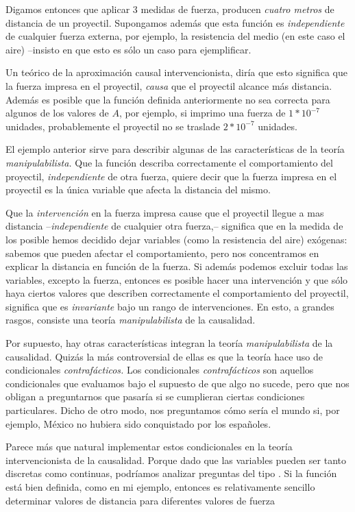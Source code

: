 Digamos entonces que aplicar 3 medidas de fuerza, producen
\emph{cuatro metros} de distancia de un proyectil. Supongamos además
que esta función es \emph{independiente} de cualquier fuerza externa,
por ejemplo, la resistencia del medio (en este caso el aire)
--insisto en que esto es sólo un caso para ejemplificar.

Un teórico de la aproximación causal intervencionista, diría que
esto significa que la fuerza impresa en el proyectil, \emph{causa}
que el proyectil alcance más distancia. Además es posible que la
función definida anteriormente no sea correcta para algunos de los
valores de $A$, por ejemplo, si imprimo una fuerza de $1*10^{-7}$
unidades, probablemente el proyectil no se traslade $2*10^{-7}$
unidades.

El ejemplo anterior sirve para describir algunas de las características de la teoría \emph{manipulabilista.}
Que la función describa correctamente el comportamiento del
proyectil, \emph{independiente} de otra fuerza, quiere decir que la
fuerza impresa en el proyectil es la única variable que afecta la
distancia del mismo.

Que la \emph{intervención} en la fuerza impresa cause que el
proyectil llegue a mas distancia --\emph{independiente} de cualquier
otra fuerza,-- significa que en la medida de los posible hemos
decidido dejar variables (como la resistencia del aire) exógenas:
sabemos que pueden afectar el comportamiento, pero nos concentramos
en explicar la distancia en función de la fuerza. Si además podemos
excluir todas las variables, excepto la fuerza, entonces es posible
hacer una intervención  y que sólo haya ciertos
valores que describen correctamente el comportamiento del proyectil,
significa que es \emph{invariante} bajo un rango de intervenciones.
En esto, a grandes rasgos, consiste una teoría \emph{manipulabilista}
de la causalidad.

Por supuesto, hay otras características integran la teoría \emph
{manipulabilista} de la causalidad. Quizás la más controversial de
ellas es que la teoría hace uso de condicionales
\emph{contrafácticos.} Los condicionales \emph{contrafácticos} son
aquellos condicionales que evaluamos bajo el supuesto de que algo no
sucede, pero que nos obligan a preguntarnos que pasaría si se
cumplieran ciertas condiciones particulares.
Dicho de otro modo, nos preguntamos cómo sería el mundo si, por
ejemplo, México no hubiera sido conquistado por los españoles.

Parece más que natural implementar estos condicionales en la teoría
intervencionista de la causalidad. Porque dado que las variables
pueden ser tanto discretas como continuas, podríamos analizar
preguntas del tipo . Si la función está bien definida,
como en mi ejemplo, entonces es relativamente sencillo determinar
valores de distancia para diferentes valores de fuerza

